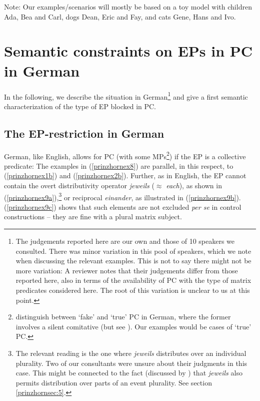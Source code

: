 \documentclass[output=paper,colorlinks,citecolor=brown,
]{langscibook}
\begin{document}
Note: Our examples/scenarios will mostly be based on a toy model with children Ada, Bea and Carl, dogs Dean, Eric and Fay, and cats Gene, Hans and Ivo. 



\section{Semantic constraints on EPs in PC in German}\label{prinzhornsec:2}

In the following, we describe the situation in German\footnote{The judgements reported here are our own and those of 10 speakers we consulted. There was minor variation in this pool of speakers, which we note when discussing the relevant examples. This is not to say there might not be more variation: A reviewer notes that their judgements differ from those reported here, also in terms of the availability of PC with the type of matrix predicates considered here. The root of this variation is unclear to us at this point.} and give a first semantic characterization of the type of EP blocked in PC.

\subsection{The EP-restriction in German}\label{prinzhornsec:2.1}

German, like English, allows for PC (with some MPs\footnote{\cite{Pitteroff:2017} distinguish between `fake' and `true' PC in German, where the former involves a silent comitative (but see \citealt{Landau:2016}). Our examples would be cases of `true' PC.}) if the EP is a collective predicate: The examples in (\ref{prinzhornex8}) are parallel, in this respect, to (\ref{prinzhornex1b}) and  (\ref{prinzhornex2b}). Further, as in English, the EP cannot contain the overt distributivity operator \textit{jeweils} ($\approx$ \textit{each}), as shown in (\ref{prinzhornex9a}),\footnote{The relevant reading is the one where \textit{jeweils} distributes over an individual plurality. Two of our consultants were unsure about their judgments in this case. This might be connected to  the fact (discussed by \citealt{Zimmermann:2002}) that \textit{jeweils} also permits distribution over parts of an event plurality.  See section \ref{prinzhornsec:5}.} or reciprocal \textit{einander}, as illustrated in (\ref{prinzhornex9b}). (\ref{prinzhornex9c}) shows that such elements are not excluded \textit{per se} in control constructions -- they are fine with a plural matrix subject.
\end{document}
